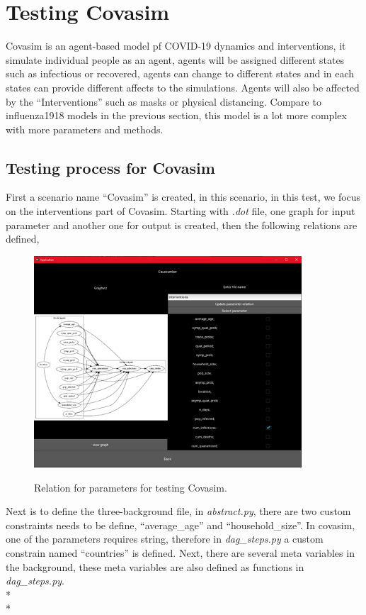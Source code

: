 \section{Testing Covasim}
Covasim is an agent-based model pf COVID-19 dynamics and interventions, it simulate individual people as an agent, agents will be assigned different states such as infectious or recovered, agents can change to different states and in each states can provide different affects to the simulations. Agents will also be affected by the “Interventions” such as masks or physical distancing. Compare to influenza1918 models in the previous section, this model is a lot more complex with more parameters and methods. 
\subsection{Testing process for Covasim}
First a scenario name “Covasim” is created, in this scenario, in this test, we focus on the interventions part of Covasim. Starting with \textsl{.dot} file, one graph for input parameter and another one for output is created, then the following relations are defined,
\begin{figure}[H]
	\centering
	\includegraphics[width=10cm]{figures/CovasimTestProcess2.png}\\
	\caption{Relation for parameters for testing Covasim.}
	\label{fig:figure35}
\end{figure}
Next is to define the three-background file, in \textsl{abstract.py}, there are two custom constraints needs to be define, “average\_age” and “household\_size”. In covasim, one of the parameters requires string, therefore in \textsl{dag\_steps.py} a custom constrain named “countries” is defined. Next, there are several meta variables in the background, these meta variables are also defined as functions in \textsl{dag\_steps.py}. \\*\\*
